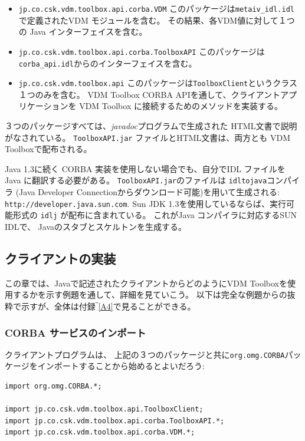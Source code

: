\documentclass[\pformat,12pt]{jarticle}
\begin{document}
\begin{itemize}
\item  {\tt jp.co.csk.vdm.toolbox.api.corba.VDM}
  このパッケージは{\tt metaiv\_idl.idl} で定義されたVDM モジュールを含む。
その結果、各VDM値に対して１つの Java インターフェイスを含む。

\item {\tt jp.co.csk.vdm.toolbox.api.corba.ToolboxAPI} 
  このパッケージは{\tt corba\_api.idl}からのインターフェイスを含む。

\item {\tt jp.co.csk.vdm.toolbox.api} 
  このパッケージは{\tt ToolboxClient}というクラス１つのみを含む。
 VDM Toolbox CORBA APIを通して、クライアントアプリケーションを VDM Toolbox に接続するためのメソッドを実装する。
\end{itemize}

３つのパッケージすべては、{\em javadoc}プログラムで生成された HTML文書で説明がなされている。
 {\tt ToolboxAPI.jar} ファイルとHTML文書は、両方とも VDM Toolboxで配布される。

Java 1.3に続く CORBA 実装を使用しない場合でも、自分でIDL ファイルを Java に翻訳する必要がある。
\texttt{ToolboxAPI.jar}のファイルは {\tt idltojava}コンパイラ (Java Developer Connectionからダウンロード可能)を用いて生成される: 
\verb+http://developer.java.sun.com+. 
 Sun JDK 1.3を使用しているならば、実行可能形式の {\tt idlj} が配布に含まれている。
これがJava コンパイラに対応するSUN IDLで、 Javaのスタブとスケルトンを生成する。


\subsection{クライアントの実装}

この章では、Javaで記述されたクライアントからどのようにVDM Toolboxを使用するかを示す例題を通して、詳細を見ていこう。
以下は完全な例題からの抜粋で示すが、全体は付録‾\ref{A4}で見ることができる。

\subsubsection{CORBA サービスのインポート}

クライアントプログラムは、 上記の３つのパッケージと共に{\tt org.omg.CORBA}パッケージをインポートすることから始めるとよいだろう:

\begin{verbatim}
import org.omg.CORBA.*;

import jp.co.csk.vdm.toolbox.api.ToolboxClient;
import jp.co.csk.vdm.toolbox.api.corba.ToolboxAPI.*;
import jp.co.csk.vdm.toolbox.api.corba.VDM.*;
\end{verbatim}
\end{document}
